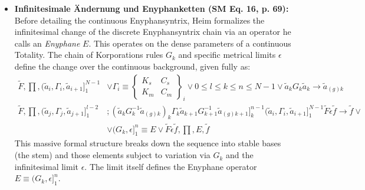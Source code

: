 \documentclass[12pt]{article}
\newcommand{\syntrixtotalitaet}{T0}
\newcommand{\diskreteEnyphansyntrix}{\bm{y\widetilde{a}}}
\begin{document}
\begin{itemize}
\begin{itemize}
        \item This type of operation represents discrete transformations, specific computations, or constructive processes that \textit{utilize elements drawn from} the vast potential state space defined by \( \syntrixtotalitaet \). For the resulting structure \( \diskreteEnyphansyntrix_\beta \) (or \( \diskreteEnyphansyntrix_a \) if it represents the transformed entity itself, in a self-modification scenario) to be considered as \textit{defined within} or belonging to the original Totality \( \syntrixtotalitaet \), a consistency condition must be met: its constituent components (namely, the selected Syntrices \( \diskreteEnyphansyntrix_{b_i} \) and the Korporators \( T_j \) that implement the operational rule \( \diskreteEnyphansyntrix_a \)) must themselves belong to, or be generatable within, that same Totality \( \syntrixtotalitaet \) (as implied by SM p. 68). This is analogous to applying logical inference rules (which are forms of Korporators in Heim's system) to existing propositions (which are Syntrices drawn from \( \syntrixtotalitaet \)) to derive new propositions that are still considered part of the same overarching logical system. The Diskrete Enyphansyntrix is thus a way of actualizing specific, complex, realized structures from the general, diffuse potential of \( \syntrixtotalitaet \).
    \end{itemize}

    \item \textbf{Infinitesimale Ändernung und Enyphanketten (SM Eq. 16, p. 69):}
    Before detailing the continuous Enyphansyntrix, Heim formalizes the infinitesimal change of the discrete Enyphansyntrix chain via an operator he calls an \textit{Enyphane} $E$. This operates on the dense parameters of a continuous Totality. The chain of Korporations rules $G_k$ and specific metrical limits $\epsilon$ define the change over the continuous background, given fully as:
    \begin{align}
    \widetilde{F}, \prod, ( \widetilde{a}_i, \Gamma_i, \widetilde{a}_{i+1} ]_1^{N-1} &\vee \Gamma_i \equiv \begin{Bmatrix} K_s & C_s \\ K_m & C_m \end{Bmatrix}_i \vee 0 \le l \le k \le n \le N-1 \vee \widetilde{a}_k G_k \widetilde{a}_k \to \widetilde{a}_{(g)k} \nonumber \\
    \widetilde{F}, \prod, ( \widetilde{a}_j, \Gamma_j, \widetilde{a}_{j+1} ]_1^{l-2} &; ( \widetilde{a}_k G_k^{-1} \widetilde{a}_{(g)k} )_k \Gamma_k \widetilde{a}_{k+1} G_{k+1}^{-1} \widetilde{a}_{(g)k+1} ]_k^{n-1} ( \widetilde{a}_i, \Gamma_i, \widetilde{a}_{i+1} ]_1^{N-1} \widetilde{F} \epsilon \widetilde{f} \to \widetilde{f} \vee \nonumber \\
    &\vee (G_k, \epsilon]_1^n \equiv E \vee \widetilde{F} \epsilon \widetilde{f}, \prod, E, \widetilde{f}
    \label{eq:original_enyphankette_16}
    \end{align}
    This massive formal structure breaks down the sequence into stable bases (the stem) and those elements subject to variation via $G_k$ and the infinitesimal limit $\epsilon$. The limit itself defines the Enyphane operator $E \equiv (G_k, \epsilon]_1^n$.


\end{itemize}
\end{document}
